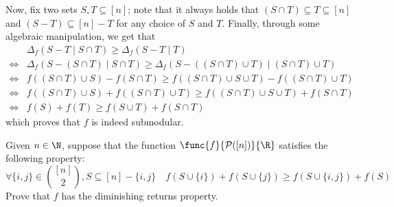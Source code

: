 \documentclass[a4paper, 12pt]{report}
\begin{document}
{        Now, fix two sets $S, T \subseteq [n]$; note that it always holds that $(S \cap T) \subseteq T \subseteq [n]$ and $(S - T) \subseteq [n] - T$ for any choice of $S$ and $T$. Finally, through some algebraic manipulation, we get that
        \begin{equation*}
            \begin{split}
                     & \Delta_f(S - T \mid S \cap T) \ge \Delta_f(S - T \mid T) \\
                \iff & \Delta_f(S - (S \cap T) \mid S \cap T) \ge \Delta_f(S - ((S \cap T) \cup T) \mid (S \cap T) \cup T) \\
                \iff & f((S \cap T) \cup S) - f(S \cap T) \ge f((S \cap T) \cup S \cup T) - f((S \cap T) \cup T) \\
                \iff & f((S \cap T) \cup S) + f((S \cap T) \cup T) \ge f((S \cap T) \cup S \cup T) + f(S \cap T) \\
                \iff & f(S) + f(T) \ge f(S \cup T) + f(S \cap T)
            \end{split}
        \end{equation*}
        which proves that $f$ is indeed submodular.
    }

    \begin{framedprob}{}
        Given $n \in \N$, suppose that the function $\func{f}{\mathcal P([n])}{\R}$ satisfies the following property: $$\forall \{i, j\} \in \binom{[n]}{2}, S \subseteq [n] - \{i, j\} \quad f(S \cup \{i\}) + f(S \cup \{j\}) \ge f(S \cup \{i, j \}) + f(S)$$ Prove that $f$ has the diminishing returns property.
    \end{framedprob}
\end{document}
